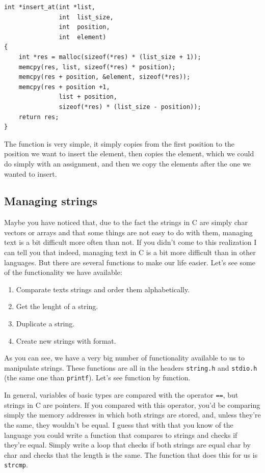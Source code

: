\documentclass[a4paper]{article}
\begin{document}
\noindent
\begin{minipage}[H]{\linewidth}
\mbox{}
\begin{lstlisting}[style=C,
caption={Utilización de la función \texttt{memcpy}},
label={lst:memcpyExample}]
int *insert_at(int *list,
               int  list_size,
               int  position,
               int  element)
{
    int *res = malloc(sizeof(*res) * (list_size + 1));
    memcpy(res, list, sizeof(*res) * position);
    memcpy(res + position, &element, sizeof(*res));
    memcpy(res + position +1,
               list + position,
               sizeof(*res) * (list_size - position));
    return res;
}
\end{lstlisting}
\end{minipage}

The function is very simple, it simply copies from the first position to the
position we want to insert the element, then copies the element, which we could
do simply with an assignment, and then we copy the elements after the one we
wanted to insert.

\subsection{Managing strings}
Maybe you have noticed that, due to the fact the strings in C are simply char
vectors or arrays and that some things are not easy to do with them, managing
text is a bit difficult more often than not. If you didn't come to this
realization I can tell you that indeed, managing text in C is a bit more
difficult than in other languages. But there are several functions to make our
life easier. Let's see some of the functionality we have available:
\begin{enumerate}
\item Comparate texts strings and order them alphabetically.
\item Get the lenght of a string.
\item Duplicate a string.
\item Create new strings with format.
\end{enumerate}

As you can see, we have a very big number of functionality available to us to
manipulate strings. These functions are all in the headers \verb!string.h! and
\verb!stdio.h! (the same one than \verb!printf!). Let's see function by
function.

In general, variables of basic types are compared with the operator \verb!==!,
but strings in C are pointers. If you compared with this operator, you'd be
comparing simply the memory addresses in which both strings are stored, and,
unless they're the same, they wouldn't be equal. I guess that with that you know
of the language you could write a function that compares to strings and checks
if they're equal. Simply write a loop that checks if both strings are equal char
by char and checks that the length is the same. The function that does this for
us is \verb!strcmp!.
\end{document}
